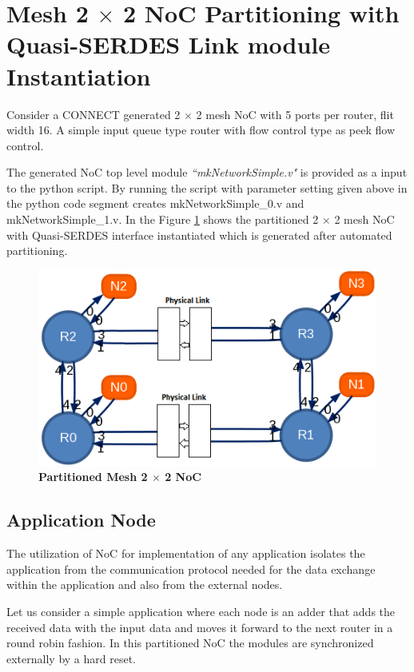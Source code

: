 \section{Mesh 2 $\times$ 2 NoC Partitioning with Quasi-SERDES Link module Instantiation}

Consider a CONNECT generated 2 $\times$ 2 mesh NoC with 5 ports per router, flit width 16. A simple input queue type router with flow control type as peek flow control. 

The generated NoC top level module \textit{``mkNetworkSimple.v"} is provided as a input to the python script. By running the script with parameter setting given above in the python code segment creates mkNetworkSimple\_0.v and mkNetworkSimple\_1.v. In the Figure \ref{PartitionedNoC2x2Mesh} shows the partitioned 2 $\times$ 2 mesh NoC with Quasi-SERDES interface instantiated which is generated after automated partitioning. 

\begin{centering}
\begin{figure}[H]
  \centering
   \includegraphics[scale=0.7]{./figs/PartitionedNoC2x2Mesh}
  \caption{\textbf{Partitioned Mesh 2 $\times$ 2 NoC}}
  \label{PartitionedNoC2x2Mesh}
\end{figure}
\end{centering}

\subsection{Application Node}
The utilization of NoC for implementation of any application isolates the application from the communication protocol needed for the data exchange within the application and also from the external nodes.

Let us consider a simple application where each node is an adder that adds the received data with the input data and moves it forward to the next router in a round robin fashion. In this partitioned NoC the modules are synchronized externally by a hard reset. 

